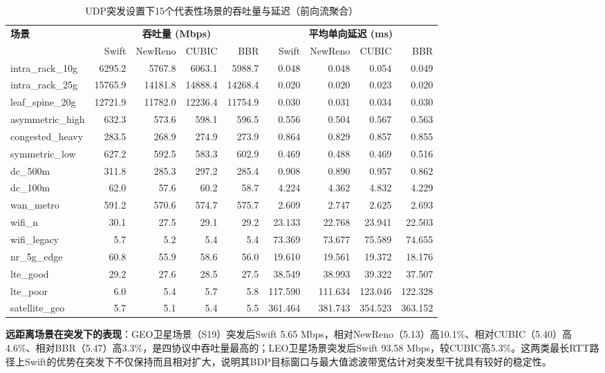 \documentclass[10pt,twocolumn]{article}
\begin{document}
\begin{table}[htbp]
\centering
\caption{UDP突发设置下15个代表性场景的吞吐量与延迟（前向流聚合）}
\label{tab:udp-burst-headline}
\footnotesize
\setlength{\tabcolsep}{4pt}
\begin{tabular}{@{}lrrrrrrrr@{}}
\toprule
\textbf{场景} & \multicolumn{4}{c}{\textbf{吞吐量 (Mbps)}} & \multicolumn{4}{c}{\textbf{平均单向延迟 (ms)}} \\
\cmidrule(lr){2-5} \cmidrule(lr){6-9}
 & Swift & NewReno & CUBIC & BBR & Swift & NewReno & CUBIC & BBR \\
\midrule
intra\_rack\_10g & 6295.2 & 5767.8 & 6063.1 & 5988.7 & 0.048 & 0.048 & 0.054 & 0.049 \\
intra\_rack\_25g & 15765.9 & 14181.8 & 14888.4 & 14268.4 & 0.020 & 0.020 & 0.023 & 0.020 \\
leaf\_spine\_20g & 12721.9 & 11782.0 & 12236.4 & 11754.9 & 0.030 & 0.031 & 0.034 & 0.030 \\
asymmetric\_high & 632.3 & 573.6 & 598.1 & 596.5 & 0.556 & 0.504 & 0.567 & 0.563 \\
congested\_heavy & 283.5 & 268.9 & 274.9 & 273.9 & 0.864 & 0.829 & 0.857 & 0.855 \\
symmetric\_low & 627.2 & 592.5 & 583.3 & 602.9 & 0.469 & 0.488 & 0.469 & 0.516 \\
dc\_500m & 311.8 & 285.3 & 297.2 & 285.4 & 0.908 & 0.890 & 0.957 & 0.862 \\
dc\_100m & 62.0 & 57.6 & 60.2 & 58.7 & 4.224 & 4.362 & 4.832 & 4.229 \\
wan\_metro & 591.2 & 570.6 & 574.7 & 575.7 & 2.609 & 2.747 & 2.625 & 2.693 \\
wifi\_n & 30.1 & 27.5 & 29.1 & 29.2 & 23.133 & 22.768 & 23.941 & 22.503 \\
wifi\_legacy & 5.7 & 5.2 & 5.4 & 5.4 & 73.369 & 73.677 & 75.589 & 74.655 \\
nr\_5g\_edge & 60.8 & 55.9 & 58.6 & 56.0 & 19.610 & 19.561 & 19.372 & 18.176 \\
lte\_good & 29.2 & 27.6 & 28.5 & 27.5 & 38.549 & 38.993 & 39.322 & 37.507 \\
lte\_poor & 6.0 & 5.4 & 5.7 & 5.8 & 117.590 & 111.634 & 123.046 & 122.328 \\
satellite\_geo & 5.7 & 5.1 & 5.4 & 5.5 & 361.464 & 381.743 & 354.523 & 363.152 \\
\bottomrule
\end{tabular}
\end{table}

\textbf{远距离场景在突发下的表现}：GEO卫星场景（S19）突发后Swift 5.65 Mbps，相对NewReno（5.13）高10.1\%、相对CUBIC（5.40）高4.6\%、相对BBR（5.47）高3.3\%，是四协议中吞吐量最高的；LEO卫星场景突发后Swift 93.58 Mbps，较CUBIC高5.3\%。这两类最长RTT路径上Swift的优势在突发下不仅保持而且相对扩大，说明其BDP目标窗口与最大值滤波带宽估计对突发型干扰具有较好的稳定性。
\end{document}
